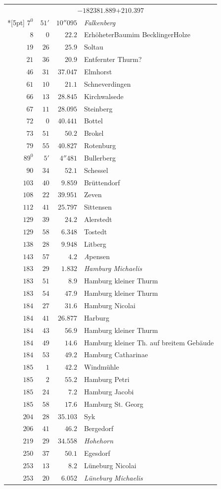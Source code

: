 \begin{longtable}{@{}rrrp{.61\linewidth}@{}}
\multicolumn{4}{c}{\(-182381.889\)\qquad\(+210.397\)}\\*[5pt]
\(7^{0}\)&\(51'\)&\(10''095\)&\raggedright \textit{Falkenberg}\tabularnewline
\(8\)&\(0\)&\(22.2\)&\raggedright ErhöheterBaumim BecklingerHolze\tabularnewline
\(19\)&\(26\)&\(25.9\)&\raggedright Soltau\tabularnewline
\(21\)&\(36\)&\(20.9\)&\raggedright Entfernter Thurm?\tabularnewline
\(46\)&\(31\)&\(37.047\)&\raggedright Elmhorst\tabularnewline
\(61\)&\(10\)&\(21.1\)&\raggedright Schneverdingen\tabularnewline
\(66\)&\(13\)&\(28.845\)&\raggedright Kirchwalsede\tabularnewline
\(67\)&\(11\)&\(28.095\)&\raggedright Steinberg\tabularnewline
\(72\)&\(0\)&\(40.441\)&\raggedright Bottel\tabularnewline
\(73\)&\(51\)&\(50.2\)&\raggedright Brokel\tabularnewline
\(79\)&\(55\)&\(40.827\)&\raggedright Rotenburg\tabularnewline
\(89^{0}\)&\(5'\)&\(4''481\)&\raggedright Bullerberg\tabularnewline
\(90\)&\(34\)&\(52.1\)&\raggedright Schessel\tabularnewline
\(103\)&\(40\)&\(9.859\)&\raggedright Brüttendorf\tabularnewline
\(108\)&\(22\)&\(39.951\)&\raggedright Zeven\tabularnewline
\(112\)&\(41\)&\(25.797\)&\raggedright Sittensen\tabularnewline
\(129\)&\(39\)&\(24.2\)&\raggedright Alerstedt\tabularnewline
\(129\)&\(58\)&\(6.348\)&\raggedright Tostedt\tabularnewline
\(138\)&\(28\)&\(9.948\)&\raggedright Litberg\tabularnewline
\(143\)&\(57\)&\(4.2\)&\raggedright \textit{A}pensen\tabularnewline
\(183\)&\(29\)&\(1.832\)&\raggedright \textit{Hamburg Michaelis}\tabularnewline
\(183\)&\(51\)&\(8.9\)&\raggedright Hamburg kleiner Thurm\tabularnewline
\(183\)&\(54\)&\(47.9\)&\raggedright Hamburg kleiner Thurm\tabularnewline
\(184\)&\(27\)&\(31.6\)&\raggedright Hamburg Nicolai\tabularnewline
\(184\)&\(41\)&\(26.877\)&\raggedright Harburg\tabularnewline
\(184\)&\(43\)&\(56.9\)&\raggedright Hamburg kleiner Thurm\tabularnewline
\(184\)&\(49\)&\(14.6\)&\raggedright Hamburg kleiner Th. auf breitem Gebäude\tabularnewline
\(184\)&\(53\)&\(49.2\)&\raggedright Hamburg Catharinae\tabularnewline
\(185\)&\(1\)&\(42.2\)&\raggedright Windmühle\tabularnewline
\(185\)&\(2\)&\(55.2\)&\raggedright Hamburg Petri\tabularnewline
\(185\)&\(24\)&\(7.2\)&\raggedright Hamburg Jacobi\tabularnewline
\(185\)&\(58\)&\(17.6\)&\raggedright Hamburg St. Georg\tabularnewline
\(204\)&\(28\)&\(35.103\)&\raggedright Syk\tabularnewline
\(206\)&\(41\)&\(46.2\)&\raggedright Bergedorf\tabularnewline
\(219\)&\(29\)&\(34.558\)&\raggedright \textit{Hohehorn}\tabularnewline
\(250\)&\(37\)&\(50.1\)&\raggedright Egesdorf\tabularnewline
\(253\)&\(13\)&\(8.2\)&\raggedright Lüneburg Nicolai\tabularnewline
\(253\)&\(20\)&\(6.052\)&\raggedright \textit{Lüneburg Michaelis}\tabularnewline

\end{longtable}
